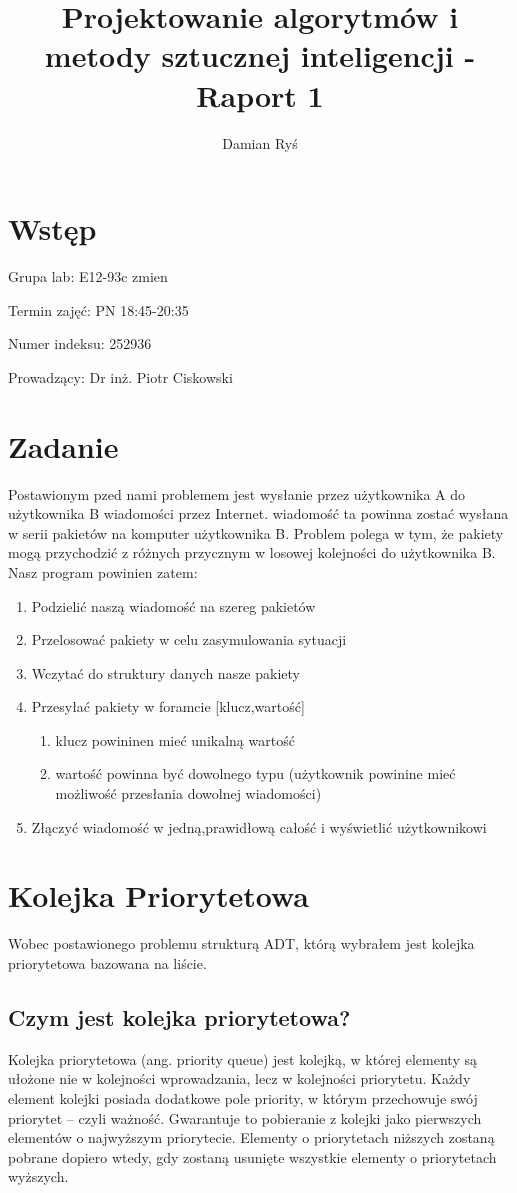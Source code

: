 \documentclass{article}
\title{Projektowanie algorytmów i metody sztucznej inteligencji - Raport 1}
\author{Damian Ryś}
\begin{document}
\maketitle


\tableofcontents
\section{Wstęp}
Grupa lab: E12-93c zmien

Termin zajęć: PN 18:45-20:35

Numer indeksu: 252936

Prowadzący: Dr inż. Piotr Ciskowski
\newpage
\section{Zadanie}
Postawionym pzed nami problemem jest wysłanie przez użytkownika A do użytkownika B wiadomości przez Internet.
wiadomość ta powinna zostać wysłana w serii pakietów na komputer użytkownika B.
Problem polega w tym, że pakiety mogą przychodzić z różnych przycznym w losowej kolejności do użytkownika B.
Nasz program powinien zatem:
\begin{enumerate}
    \item Podzielić naszą wiadomość na szereg pakietów
    \item Przelosować pakiety w celu zasymulowania sytuacji
    \item Wczytać do struktury danych nasze pakiety
    \item Przesyłać pakiety w foramcie [klucz,wartość]
    \begin{enumerate}
        \item klucz powininen mieć unikalną wartość
        \item wartość powinna być dowolnego typu (użytkownik powinine mieć możliwość przesłania dowolnej wiadomości)
    \end{enumerate}
    \item Złączyć wiadomość w jedną,prawidłową całość i wyświetlić użytkownikowi
\end{enumerate}
\section{Kolejka Priorytetowa}
Wobec postawionego problemu strukturą ADT, którą wybrałem jest kolejka priorytetowa bazowana na liście.
\subsection{Czym jest kolejka priorytetowa?}
Kolejka priorytetowa (ang. priority queue) jest kolejką, w której elementy są ułożone nie w kolejności wprowadzania, lecz w kolejności priorytetu.
Każdy element kolejki posiada dodatkowe pole priority, w którym przechowuje swój priorytet – czyli ważność.
Gwarantuje to pobieranie z kolejki jako pierwszych elementów o najwyższym priorytecie. 
Elementy o priorytetach niższych zostaną pobrane dopiero wtedy, gdy zostaną usunięte wszystkie elementy o priorytetach wyższych.
\end{document}
